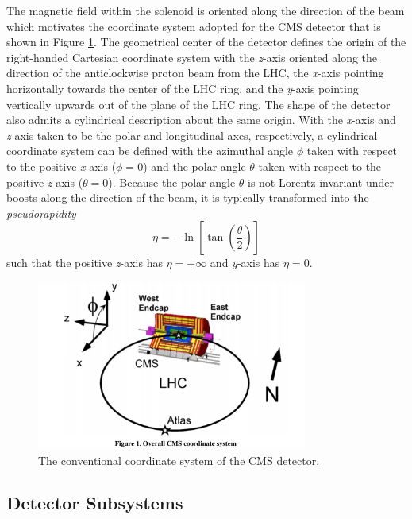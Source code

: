 The magnetic field within the solenoid is oriented along the direction of the beam which motivates the coordinate system adopted for the CMS detector that is shown in Figure \ref{fig:CMS_coord_sys}. The geometrical center of the detector defines the origin of the right-handed Cartesian coordinate system with the \textit{z}-axis oriented along the direction of the anticlockwise proton beam from the LHC, the \textit{x}-axis pointing horizontally towards the center of the LHC ring, and the \textit{y}-axis pointing vertically upwards out of the plane of the LHC ring. The shape of the detector also admits a cylindrical description about the same origin. With the \textit{x}-axis and \textit{z}-axis taken to be the polar and longitudinal axes, respectively, a cylindrical coordinate system can be defined with the azimuthal angle $\phi$ taken with respect to the positive \textit{x}-axis ($\phi = 0$) and the polar angle $\theta$ taken with respect to the positive \textit{z}-axis ($\theta = 0$). Because the polar angle $\theta$ is not Lorentz invariant under boosts along the direction of the beam, it is typically transformed into the \textit{pseudorapidity}
\begin{equation}
  \eta = -\ln\left[\tan\left(\frac{\theta}{2}\right)\right]
\end{equation}
such that the positive \textit{z}-axis has $\eta = + \infty$ and \textit{y}-axis has $\eta = 0$.

\begin{figure}[htbp]
  \centering
    \includegraphics[width=3.5in]{images/CMS_coord_sys}
    \caption[Coordinate System of the CMS Detector]{The conventional coordinate system of the CMS detector.\cite{CMSCoordSys}}
    \label{fig:CMS_coord_sys}
\end{figure}

\subsection{Detector Subsystems}

